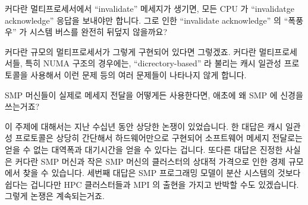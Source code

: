 \begin{enumerate}
\QuickQ{}
	커다란 멀티프로세서에서 ``invalidate'' 메세지가 생기면, 모든 CPU 가
	``invalidatge acknowledge'' 응답을 보내야만 합니다.
	그로 인한 ``invalidate acknowledge'' 의 ``폭풍우'' 가 시스템 버스를
	완전히 뒤덮지 않을까요?

\QuickA{}
	커다란 규모의 멀티프로세서가 그렇게 구현되어 있다면 그렇겠죠.
	커다란 멀티프로세서들, 특히 NUMA 구조의 경우에는, ``dicrectory-based''
	라 불리는 캐시 일관성 프로토콜을 사용해서 이런 문제 등의 여러 문제들이
	나타나지 않게 합니다.

\QuickQ{}
	SMP 머신들이 실제로 메세지 전달을 어떻게든 사용한다면, 애초에 왜 SMP 에
	신경을 쓰는거죠?

\QuickA{}
	이 주제에 대해서는 지난 수십년 동안 상당한 논쟁이 있었습니다.
	한 대답은 캐시 일관성 프로토콜은 상당히 간단해서 하드웨어만으로
	구현되어 소프트웨어 메세지 전달로는 얻을 수 없는 대역폭과 대기시간을
	얻을 수 있다는 겁니다.
	또다른 대답은 진정한 사실은 커다란 SMP 머신과 작은 SMP 머신의
	클러스터의 상대적 가격으로 인한 경제 규모에서 찾을 수 있습니다.
	세번째 대답은 SMP 프로그래밍 모델이 분산 시스템의 것보다 쉽다는
	겁니다만 HPC 클러스터들과 MPI 의 출현을 가지고 반박할 수도 있겠습니다.
	그렇게 논쟁은 계속되는거죠.

\end{enumerate}
